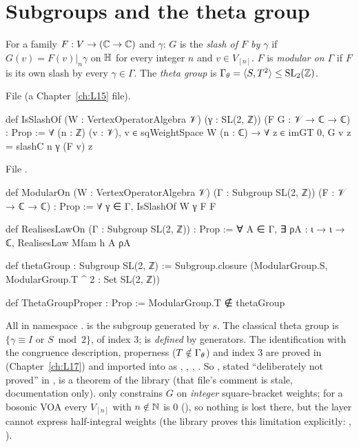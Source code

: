 \section{Subgroups and the theta group}\label{l14:sec:theta}

\begin{definition}\label{l14:def:theta}
For a family $F:V\to({\mathbb{C}}\to{\mathbb{C}})$ and $\gamma$: $G$ is the \emph{slash of $F$ by $\gamma$} if $G(v) = F(v)|_n\gamma$ on
$\mathbb{H}$ for every integer $n$ and $v\in V_{[n]}$. $F$ is \emph{modular on $\Gamma$} if $F$ is its own slash by every
$\gamma\in\Gamma$. The \emph{theta group} is $\Gamma_\theta = \langle S,T^2\rangle\le\mathrm{SL}_2(\mathbb{Z})$.
\end{definition}
\noindent File  (a Chapter~\ref{ch:L15} file).
\begin{leancode}
def IsSlashOf (W : VertexOperatorAlgebra 𝒱) (γ : SL(2, ℤ)) (F G : 𝒱 → ℂ → ℂ) : Prop :=
  ∀ (n : ℤ) (v : 𝒱), v ∈ sqWeightSpace W (n : ℂ) → ∀ z ∈ imGT 0, G v z = slashC n γ (F v) z
\end{leancode}
\noindent File .
\begin{leancode}
def ModularOn (W : VertexOperatorAlgebra 𝒱) (Γ : Subgroup SL(2, ℤ)) (F : 𝒱 → ℂ → ℂ) : Prop :=
  ∀ γ ∈ Γ, IsSlashOf W γ F F

def RealisesLawOn (Γ : Subgroup SL(2, ℤ)) : Prop :=
  ∀ A ∈ Γ, ∃ ρA : ι → ι → ℂ, RealisesLaw Mfam h A ρA

def thetaGroup : Subgroup SL(2, ℤ) :=
  Subgroup.closure ({ModularGroup.S, ModularGroup.T ^ 2} : Set SL(2, ℤ))

def ThetaGroupProper : Prop := ModularGroup.T ∉ thetaGroup
\end{leancode}
\begin{dictionary}
All in namespace .  is the subgroup generated by $s$. The classical theta group is
$\{\gamma\equiv I\text{ or }S\bmod 2\}$, of index $3$;  is \emph{defined} by generators. The identification
with the congruence description, properness ($T\notin\Gamma_\theta$) and index $3$ are proved in
 (Chapter~\ref{ch:L17}) and imported into  as
, , , . So
, stated ``deliberately not proved'' in , is a theorem of the library (that
file's comment is stale, documentation only).  only constrains $G$ on \emph{integer} square-bracket weights; for a bosonic VOA
every $V_{[n]}$ with $n\notin{\mathbb{N}}$ is $0$ (), so nothing is lost there, but the layer
cannot express half-integral weights (the library proves this limitation explicitly: ,
).
\end{dictionary}
